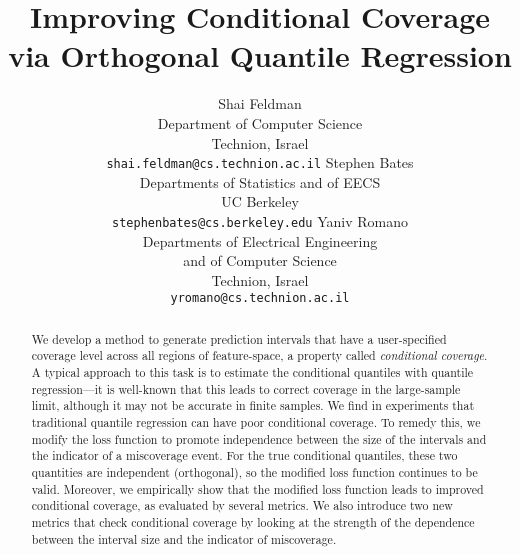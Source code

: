 \documentclass{article}
\title{Improving Conditional Coverage via Orthogonal Quantile Regression}
\author{%

   Shai Feldman \\
   Department of Computer Science \\
   Technion, Israel \\
   \texttt{shai.feldman@cs.technion.ac.il}
   \And
   Stephen Bates \\
   Departments of Statistics and of EECS \\
   UC Berkeley \\
   \texttt{stephenbates@cs.berkeley.edu}
   \And
   Yaniv Romano \\
   Departments of Electrical Engineering\\and of Computer Science \\
   Technion, Israel \\
   \texttt{yromano@cs.technion.ac.il} \\

}
\begin{document}
\maketitle

\begin{abstract}
We develop a method to generate prediction intervals that have a user-specified coverage level across all regions of feature-space, a property called \emph{conditional coverage}. A typical approach to this task is to estimate the conditional quantiles with quantile regression---it is well-known that this leads to correct coverage in the large-sample limit, although it may not be accurate in finite samples. We find in experiments that traditional quantile regression can have poor conditional coverage. To remedy this, we modify the loss function to promote independence between the size of the intervals and the indicator of a miscoverage event. For the true conditional quantiles, these two quantities are independent (orthogonal), so the modified loss function continues to be valid. Moreover, we empirically show that the modified loss function leads to improved conditional coverage, as evaluated by several metrics. We also introduce two new metrics that check conditional coverage by looking at the strength of the dependence between the interval size and the indicator of miscoverage. 


\end{abstract}
\end{document}
